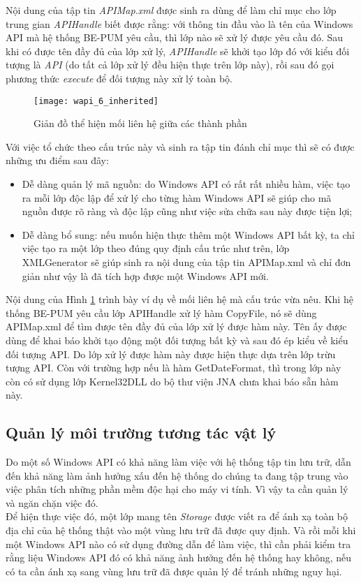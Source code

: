 Nội dung của tập tin \textit{APIMap.xml} được sinh ra dùng để làm chỉ mục cho lớp trung gian \textit{APIHandle} biết được rằng: với thông tin đầu vào là tên của Windows API mà hệ thống BE-PUM yêu cầu, thì lớp nào sẽ xử lý được yêu cầu đó. Sau khi có được tên đầy đủ của lớp xử lý, \textit{APIHandle} sẽ khởi tạo lớp đó với kiểu đối tượng là \textit{API} (do tất cả lớp xử lý đều hiện thực trên lớp này), rồi sau đó gọi phương thức \textit{execute} để đối tượng này xử lý toàn bộ.

	\begin{figure}[H]
	\centering
		\texttt{[image: wapi\_6\_inherited]}
		\caption{Giản đồ thể hiện mối liên hệ giữa các thành phần}	
		\label{fig:wapi_6_inherited}		
	\end{figure}

\newpage
Với việc tổ chức theo cấu trúc này và sinh ra tập tin đánh chỉ mục thì sẽ có được những ưu điểm sau đây:

\begin{itemize}
	\item Dễ dàng quản lý mã nguồn: do Windows API có rất rất nhiều hàm, việc tạo ra mỗi lớp độc lập để xử lý cho từng hàm Windows API sẽ giúp cho mã nguồn được rõ ràng và độc lập cũng như việc sửa chữa sau này được tiện lợi;

	\item Dễ dàng bổ sung: nếu muốn hiện thực thêm một Windows API bất kỳ, ta chỉ việc tạo ra một lớp theo đúng quy định cấu trúc như trên, lớp XMLGenerator sẽ giúp sinh ra nội dung của tập tin APIMap.xml và chỉ đơn giản như vậy là đã tích hợp được một Windows API mới.
\end{itemize}

Nội dung của Hình \ref{fig:wapi_6_inherited} trình bày ví dụ về mối liên hệ mà cấu trúc vừa nêu. Khi hệ thống BE-PUM yêu cầu lớp APIHandle xử lý hàm CopyFile, nó sẽ dùng APIMap.xml để tìm được tên đầy đủ của lớp xử lý được hàm này. Tên ấy được dùng để khai báo khởi tạo động một đối tượng bất kỳ và sau đó ép kiểu về kiểu đối tượng API. Do lớp xử lý được hàm này được hiện thực dựa trên lớp trừu tượng API. Còn với trường hợp nếu là hàm GetDateFormat, thì trong lớp này còn có sử dụng lớp Kernel32DLL do bộ thư viện JNA chưa khai báo sẵn hàm này.

	\subsection{Quản lý môi trường tương tác vật lý}

Do một số Windows API có khả năng làm việc với hệ thống tập tin lưu trữ, dẫn đến khả năng làm ảnh hưởng xấu đến hệ thống do chúng ta đang tập trung vào việc phân tích những phần mềm độc hại cho máy vi tính. Vì vậy ta cần quản lý và ngăn chặn việc đó.\\

Để hiện thực việc đó, một lớp mang tên \textit{Storage} được viết ra để ánh xạ toàn bộ địa chỉ của hệ thống thật vào một vùng lưu trữ đã được quy định. Và rồi mỗi khi một Windows API nào có sử dụng đường dẫn để làm việc, thì cần phải kiểm tra rằng liệu Windows API đó có khả năng ảnh hưởng đến hệ thống hay không, nếu có ta cần ánh xạ sang vùng lưu trữ đã được quản lý để tránh những nguy hại.
